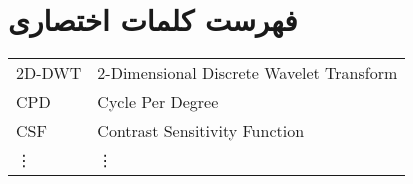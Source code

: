 \chapter*{فهرست کلمات اختصاری}  



\begin{latin}
{
\setlength{\baselineskip}{0.5\baselineskip}
\hfil
\begin{tabular}{p{3cm}l}
2D-DWT & 2-Dimensional Discrete Wavelet Transform\\
CPD & Cycle Per Degree\\
CSF & Contrast Sensitivity Function\\
\vdots & \vdots
\end{tabular}
}
\end{latin}
